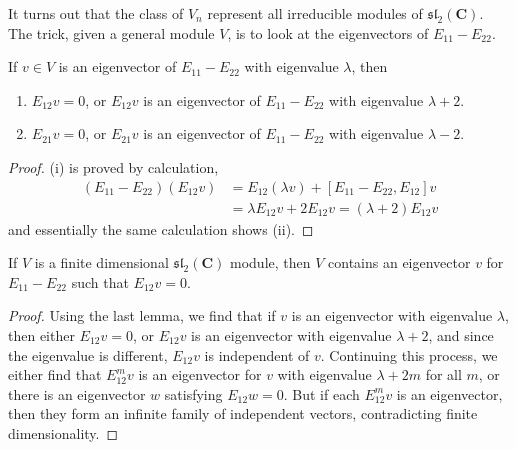 It turns out that the class of $V_n$ represent all irreducible modules of $\mathfrak{sl}_2(\mathbf{C})$. The trick, given a general module $V$, is to look at the eigenvectors of $E_{11} - E_{22}$.

\begin{lemma}
    If $v \in V$ is an eigenvector of $E_{11} - E_{22}$ with eigenvalue $\lambda$, then
    \begin{enumerate}
        \item[(i)] $E_{12} v = 0$, or $E_{12} v$ is an eigenvector of $E_{11} - E_{22}$ with eigenvalue $\lambda + 2$.
        \item[(ii)] $E_{21} v = 0$, or $E_{21} v$ is an eigenvector of $E_{11} - E_{22}$ with eigenvalue $\lambda - 2$.
    \end{enumerate}
\end{lemma}
\begin{proof}
    (i) is proved by calculation,
    \begin{align*}
        (E_{11} - E_{22})(E_{12} v) &= E_{12}(\lambda v) + [E_{11} - E_{22}, E_{12}] v\\
        &= \lambda E_{12} v + 2E_{12}v = (\lambda + 2) E_{12} v
    \end{align*}
    and essentially the same calculation shows (ii).
\end{proof}

\begin{lemma}
    If $V$ is a finite dimensional $\mathfrak{sl}_2(\mathbf{C})$ module, then $V$ contains an eigenvector $v$ for $E_{11} - E_{22}$ such that $E_{12} v = 0$.
\end{lemma}
\begin{proof}
    Using the last lemma, we find that if $v$ is an eigenvector with eigenvalue $\lambda$, then either $E_{12} v = 0$, or $E_{12} v$ is an eigenvector with eigenvalue $\lambda + 2$, and since the eigenvalue is different, $E_{12} v$ is independent of $v$. Continuing this process, we either find that $E_{12}^m v$ is an eigenvector for $v$ with eigenvalue $\lambda + 2m$ for all $m$, or there is an eigenvector $w$ satisfying $E_{12} w = 0$. But if each $E_{12}^m v$ is an eigenvector, then they form an infinite family of independent vectors, contradicting finite dimensionality.
\end{proof}

